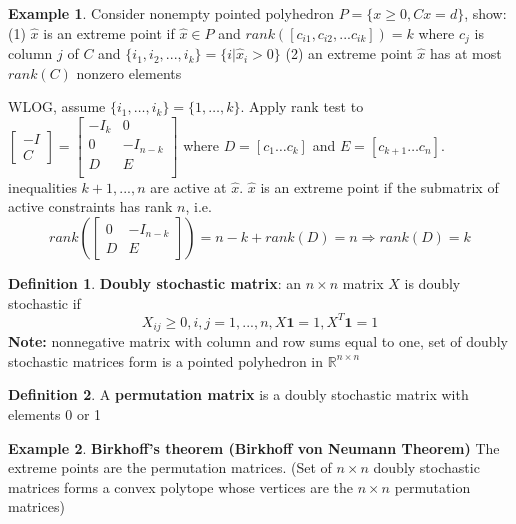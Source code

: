\documentclass[10pt]{article}
\def\red#1{{\color{red}#1}}
\def\R{\mathbb{R}}
\def\imp{\Rightarrow}
\theoremstyle{definition}
\newtheorem{defn}{Definition}[section]
\newtheorem{example}{Example}[section]
\newcommand{\Note}[0]{\noindent\textbf{Note: }}
\begin{document}
\begin{example}
	Consider nonempty pointed polyhedron $P = \{x \ge 0, Cx = d\}$, show:
	(1) $\hat{x}$ is an extreme point if $\hat{x} \in P$ and $rank([c_{i1}, c_{i2}, ... c_{ik}]) = k$
	where $c_j$ is column $j$ of $C$ and $\{i_1, i_2, ..., i_k\} = \{i | \hat{x}_{i} > 0\}$
	(2) an extreme point $\hat{x}$ has at most $rank(C)$ nonzero elements
\end{example}
\proof WLOG, assume $\{i_1, \dots, i_k\} = \{1, \dots, k\}$. Apply rank test to $\begin{bmatrix}
		-I \\ C
	\end{bmatrix} = \begin{bmatrix}
		-I_k & 0        \\
		0    & -I_{n-k} \\
		D    & E        \\
	\end{bmatrix}$ where $D = [c_1 \dots c_k]$ and $E = [c_{k+1} \dots c_n]$.
\red{inequalities $k+1, ..., n$ are active at $\hat{x}$}.
$\hat{x}$ is an extreme point if the submatrix of active constraints has rank $n$, i.e.
\begin{equation*}
	rank(\begin{bmatrix}
		0 & -I_{n-k} \\
		D & E
	\end{bmatrix}) = n - k + rank(D) = n \imp rank(D) = k
\end{equation*}
\qedhere

\begin{defn}
	\textbf{Doubly stochastic matrix}: an $n \times n$ matrix $X$ is doubly stochastic if
	\begin{equation*}
		X_{ij} \ge 0, i, j = 1, ..., n, X\textbf{1} = 1, X^T\textbf{1} = 1
	\end{equation*}
	\Note nonnegative matrix with column and row sums equal to one,
	set of doubly stochastic matrices form is a pointed polyhedron in $\R^{n\times n}$
\end{defn}

\begin{defn}
	A \textbf{permutation matrix} is a doubly stochastic matrix with elements 0 or 1
\end{defn}

\begin{example} \textbf{Birkhoff’s theorem (Birkhoff von Neumann Theorem)}
	The extreme points are the permutation matrices.
	(Set of $n \times n$ doubly stochastic matrices forms a convex polytope whose vertices are the $n \times n$ permutation matrices)
\end{example}
\end{document}
